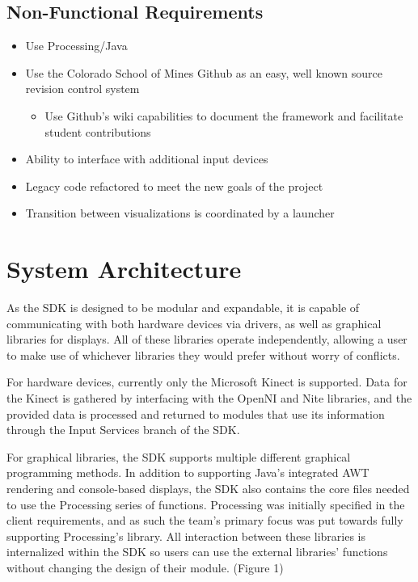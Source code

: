 \documentclass[11pt,letterpaper]{article}
\begin{document}
	\subsection{Non-Functional Requirements}
	\begin{itemize}
		\item Use Processing/Java
		\item Use the Colorado School of Mines Github as an easy, well known source revision control system
		\begin{itemize}
			\item Use Github's wiki capabilities to document the framework and facilitate student contributions
		\end{itemize}
		\item Ability to interface with additional input devices
		\item Legacy code refactored to meet the new goals of the project
		\item Transition between visualizations is coordinated by a launcher
	\end{itemize}
	\pagebreak

	\section{System Architecture}
	As the SDK is designed to be modular and expandable, it is capable of 
	communicating with both hardware devices via drivers, as well as graphical 
	libraries for displays. All of these libraries operate independently, 
	allowing a user to make use of whichever libraries they would prefer 
	without worry of conflicts. 

	For hardware devices, currently only the Microsoft Kinect is supported. 
	Data for the Kinect is gathered by interfacing with the OpenNI and Nite 
	libraries, and the provided data is processed and returned to modules that 
	use its information through the Input Services branch of the SDK. 

	For graphical libraries, the SDK supports multiple different graphical 
	programming methods. In addition to supporting Java's integrated AWT 
	rendering and console-based displays, the SDK also contains the core files 
	needed to use the Processing series of functions. Processing was initially 
	specified in the client requirements, and as such the team's primary focus 
	was put towards fully supporting Processing's library. All interaction 
	between these libraries is internalized within the SDK so users can use 
	the external libraries' functions without changing the design of their module. 
	(Figure 1)
	\pagebreak
   
\end{document}
